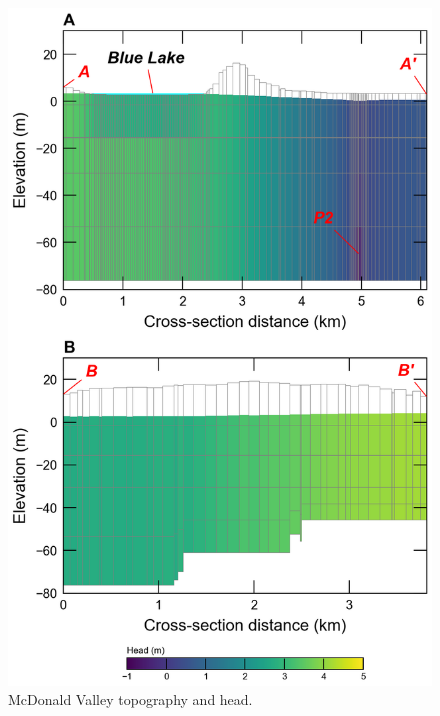 \documentclass[11pt, oneside]{article}  	%
\begin{document}

\begin{figure}[ht!]
	\begin{center}
		\includegraphics{figures/mv_voronoi_xsection.png}
	\end{center}
	\caption{McDonald Valley topography and head.}
	\label{fig:mvxsection}
\end{figure}

\end{document}
